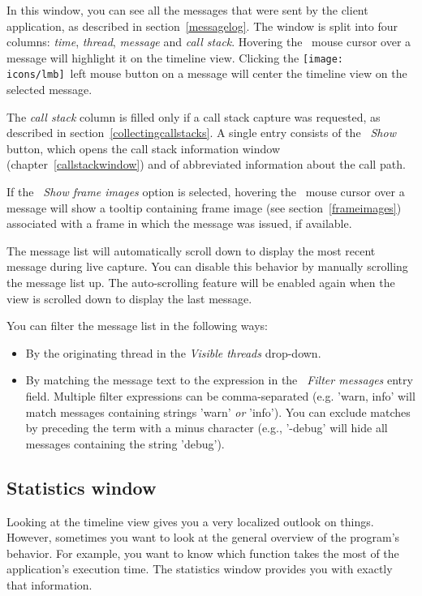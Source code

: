 \documentclass[hidelinks,titlepage,a4paper,twoside]{article}
\newcommand{\LMB}{\texttt{[image: icons/lmb]}}
\begin{document}
In this window, you can see all the messages that were sent by the client application, as described in section~\ref{messagelog}. The window is split into four columns: \emph{time}, \emph{thread}, \emph{message} and \emph{call stack}. Hovering the \faMousePointer{}~mouse cursor over a message will highlight it on the timeline view. Clicking the \LMB{}~left mouse button on a message will center the timeline view on the selected message.

The \emph{call stack} column is filled only if a call stack capture was requested, as described in section~\ref{collectingcallstacks}. A single entry consists of the \emph{\faAlignJustify{}~Show} button, which opens the call stack information window (chapter~\ref{callstackwindow}) and of abbreviated information about the call path.

If the \emph{\faImage{}~Show frame images} option is selected, hovering the \faMousePointer{}~mouse cursor over a message will show a tooltip containing frame image (see section~\ref{frameimages}) associated with a frame in which the message was issued, if available.

The message list will automatically scroll down to display the most recent message during live capture. You can disable this behavior by manually scrolling the message list up. The auto-scrolling feature will be enabled again when the view is scrolled down to display the last message.

You can filter the message list in the following ways:

\begin{itemize}
\item By the originating thread in the \emph{\faRandom{} Visible threads} drop-down.
\item By matching the message text to the expression in the \emph{\faFilter{}~Filter messages} entry field. Multiple filter expressions can be comma-separated (e.g. 'warn, info' will match messages containing strings 'warn' \emph{or} 'info'). You can exclude matches by preceding the term with a minus character (e.g., '-debug' will hide all messages containing the string 'debug').
\end{itemize}

\subsection{Statistics window}
\label{statistics}

Looking at the timeline view gives you a very localized outlook on things. However, sometimes you want to look at the general overview of the program's behavior. For example, you want to know which function takes the most of the application's execution time. The statistics window provides you with exactly that information.
\end{document}
